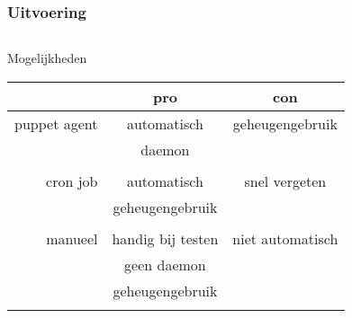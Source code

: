 \documentclass{beamer}
\begin{document}
\begin{frame}
\frametitle{Uitvoering}
\begin{columns}[c]
\begin{block}{Mogelijkheden}
\begin{tabular}{|r|c|c|}\hline
& pro & con \\ \hline
\hline
puppet agent & automatisch & geheugengebruik \\
& daemon & \\
& & \\
\hline
cron job & automatisch & snel vergeten \\
& geheugengebruik & \\
& & \\
\hline
manueel & handig bij testen & niet automatisch \\
& geen daemon & \\
& geheugengebruik & \\
& & \\
\hline
\end{tabular}
\end{block}
\end{columns}
\end{frame}
\end{document}
